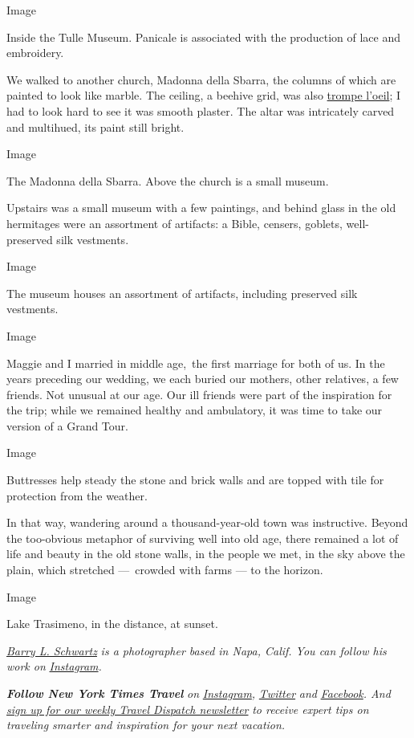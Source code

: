 Image

Inside the Tulle Museum. Panicale is associated with the production of
lace and embroidery.

We walked to another church, Madonna della Sbarra, the columns of which
are painted to look like marble. The ceiling, a beehive grid, was also
\href{https://www.tate.org.uk/art/art-terms/t/trompe-loeil}{trompe
l'oeil}; I had to look hard to see it was smooth plaster. The altar was
intricately carved and multihued, its paint still bright.

Image

The Madonna della Sbarra. Above the church is a small museum.

Upstairs was a small museum with a few paintings, and behind glass in
the old hermitages were an assortment of artifacts: a Bible, censers,
goblets, well-preserved silk vestments.

Image

The museum houses an assortment of artifacts, including preserved silk
vestments.

Image

Maggie and I married in middle age,~the first marriage for both of us.
In the years preceding our wedding, we each buried our mothers, other
relatives, a few friends. Not unusual at our age. Our ill friends were
part of the inspiration for the trip; while we remained healthy and
ambulatory, it was time to take our version of a Grand Tour.

Image

Buttresses help steady the stone and brick walls and are topped with
tile for protection from the weather.

In that way, wandering around a thousand-year-old town was instructive.
Beyond the too-obvious metaphor of surviving well into old age, there
remained a lot of life and beauty in the old stone walls, in the people
we met, in the sky above the plain, which stretched ---~crowded with
farms --- to the horizon.

Image

Lake Trasimeno, in the distance, at sunset.

\href{https://barryschwartzphoto.com/}{\emph{Barry L. Schwartz}}
\emph{is a photographer based in Napa, Calif. You can follow his work
on}
\href{https://www.instagram.com/barryschwartz1/}{\emph{Instagram}}\emph{.}

\emph{\textbf{Follow New York Times Travel}} \emph{on}
\href{https://www.instagram.com/nytimestravel/}{\emph{Instagram}}\emph{,}
\href{https://twitter.com/nytimestravel}{\emph{Twitter}} \emph{and}
\href{https://www.facebookcorewwwi.onion/nytimestravel/}{\emph{Facebook}}\emph{.
And}
\href{https://www.nytimes3xbfgragh.onion/newsletters/traveldispatch}{\emph{sign
up for our weekly Travel Dispatch newsletter}} \emph{to receive expert
tips on traveling smarter and inspiration for your next vacation.}

